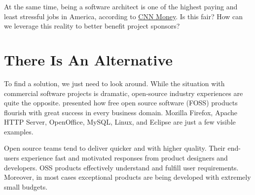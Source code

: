\documentclass[12pt,letterpaper,oneside]{article}
\newcommand{\enru}[2]{#1}
\begin{document}
    \enru{
        At the same time, being a software architect is one of the highest paying
        and least stressful jobs in America, according
        to \href{http://money.cnn.com/magazines/moneymag/bestjobs/2010/full_list/index.html}{CNN Money}.
        Is this fair? How can we leverage this reality to better benefit
        project sponsors?
    }{
        В то же время, профессия ``архитектор программного обеспечения''
        названа журналом \href{http://money.cnn.com/magazines/moneymag/bestjobs/2010/full_list/index.html}{CNN Money}
        самой высокооплачиваемой и одной из наимее стрессовой в Америке.
        Справедливо ли это и возможно ли исправить ситуацию
        к большей выгоде заказчиков?
    }








\addcontentsline{toc}{section}{\enru{There Is An Alternative}{Альтернатива существует}}
\section*{\enru{There Is An Alternative}{Альтернатива существует}}

    \enru{
        To find a solution, we just need to look around.
        While the situation with commercial software projects is
        dramatic, open-source industry experiences are quite the opposite.
        \citet{goldman05} presented how free open source software (FOSS) products
        flourish with great success in every business domain.
        Mozilla Firefox, Apache HTTP Server, OpenOffice, MySQL, Linux, and Eclipse are
        just a few visible examples.
    }{
        Решение давно существует, достаточно лишь обратить внимание
        на успехи OSS проектов.
        \citet{goldman05} подробно описывает ситуацию на рынке
        программ с открытым кодом.
        Mozilla Firefox, Apache HTTP Server, OpenOffice, MySQL, Linux, и Eclipse ---
        лишь некоторые наиболее известные примеры успехов OSS индустрии.
    }

    \enru{
        Open source teams tend to deliver quicker and with higher quality.
        Their end-users experience fast and motivated
        responses from product designers and developers.
        OSS products effectively understand and fulfill user requirements.
        Moreover, in most cases exceptional products are being developed
        with extremely small budgets.
    }{
    }
\end{document}
